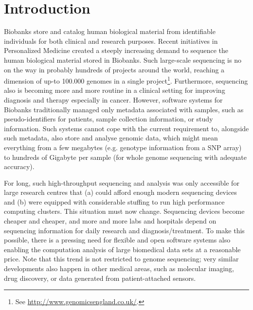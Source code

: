 
\section{Introduction}
Biobanks store and catalog human biological material from identifiable individuals for both clinical and research purposes. Recent initiatives in Personalized Medicine created a steeply increasing demand to sequence the human biological material stored in Biobanks. Such large-scale sequencing is no on the way in probably hundreds of projects around the world, reaching a dimension of up-to 100.000 genomes in a single project\footnote{See \url{http://www.genomicsengland.co.uk/}.}. Furthermore, sequencing also is becoming more and more routine in a clinical setting for improving diagnosis and therapy especially in cancer\cite{pmedicine}. However, software systems for Biobanks traditionally managed only metadata associated with samples, such as pseudo-identifiers for patients, sample collection information, or study information. Such systems cannot cope with the current requirement to, alongside such metadata, also store and analyse genomic data, which might mean everything from a few megabytes (e.g. genotype information from a SNP array) to hundreds of Gigabyte per sample (for whole genome sequencing with adequate accuracy). 

For long, such high-throughput sequencing and analysis was only accessible for large research centres that (a) could afford enough modern sequencing devices and (b) were equipped with considerable stuffing to run high performance computing clusters. This situation must now change. Sequencing devices become cheaper and cheaper, and more and more labs and hospitals depend on sequencing information for daily research and diagnosis/treatment. To make this possible, there is a pressing need for flexible and open software systems also enabling the computation analysis of large biomedical data sets at a reasonable price. Note that this trend is not restricted to genome sequencing; very similar developments also happen in other medical areas, such as molecular imaging\cite{imaging}, drug discovery\cite{drug}, or data generated from patient-attached sensors\cite{qself}. 

